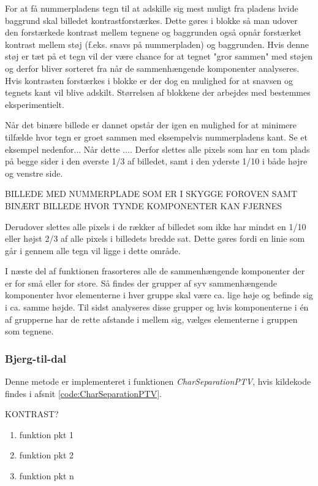 For at få nummerpladens tegn til at adskille sig mest muligt fra pladens hvide baggrund skal billedet kontrastforstærkes. Dette gøres i blokke så man udover den forstærkede kontrast mellem tegnene og baggrunden også opnår forstærket kontrast mellem støj (f.eks. snavs på nummerpladen) og baggrunden. Hvis denne støj er tæt på et tegn vil der være chance for at tegnet "gror sammen" med støjen og derfor bliver sorteret fra når de sammenhængende komponenter analyseres. Hvis kontrasten forstærkes i blokke er der dog en mulighed for at snavsen og tegnets kant vil blive adskilt. Størrelsen af blokkene der arbejdes med bestemmes eksperimentielt.

Når det binære billede er dannet opstår der igen en mulighed for at minimere tilfælde hvor tegn er groet sammen med eksempelvis nummerpladens kant. Se et eksempel nedenfor... Når dette .... Derfor slettes alle pixels som har en tom plads på begge sider i den øverste 1/3 af billedet, samt i den yderste 1/10 i både højre og venstre side.

BILLEDE MED NUMMERPLADE SOM ER I SKYGGE FOROVEN SAMT BINÆRT BILLEDE HVOR TYNDE KOMPONENTER KAN FJERNES

Derudover slettes alle pixels i de rækker af billedet som ikke har mindst en 1/10 eller højst 2/3 af alle pixels i billedets bredde sat. Dette gøres fordi en linie som går i gennem alle tegn vil ligge i dette område.

I næste del af funktionen frasorteres alle de sammenhængende komponenter der er for små eller for store. Så findes der grupper af syv sammenhængende komponenter hvor elementerne i hver gruppe skal være ca. lige høje og befinde sig i ca. samme højde. Til sidst analyseres disse grupper og hvis komponenterne i én af grupperne har de rette afstande i mellem sig, vælges elementerne i gruppen som tegnene.

\subsubsection*{Bjerg-til-dal}

Denne metode er implementeret i funktionen \textit{CharSeparationPTV}, hvis kildekode findes i afsnit \vref{code:CharSeparationPTV}.

KONTRAST?

\begin{enumerate}
\item funktion pkt 1
\item funktion pkt 2
\item funktion pkt n
\end{enumerate}

